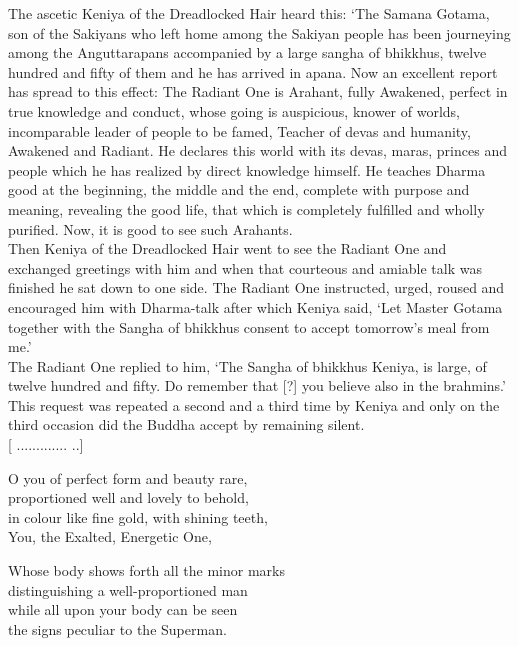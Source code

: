 The ascetic Keniya of the Dreadlocked Hair heard this: `The Samana Gotama, son of the Sakiyans who left home among the Sakiyan people has been journeying among the Anguttarapans accompanied by a large sangha of bhikkhus, twelve hundred and fifty of them and he has arrived in apana. Now an excellent report has spread to this effect: The Radiant One is Arahant, fully Awakened, perfect in true knowledge and conduct, whose going is auspicious, knower of worlds, incomparable leader of people to be famed, Teacher of devas and humanity, Awakened and Radiant. He declares this world with its devas, maras, princes and people which he has realized by direct knowledge himself. He teaches Dharma good at the beginning, the middle and the end, complete with purpose and meaning, revealing the good life, that which is completely fulfilled and wholly purified. Now, it is good to see such Arahants.\\

 Then Keniya of the Dreadlocked Hair went to see the Radiant One and exchanged greetings with him and when that courteous and amiable talk was finished he sat down to one side. The Radiant One instructed, urged, roused and encouraged him with Dharma-talk after which Keniya said, `Let Master Gotama together with the Sangha of bhikkhus consent to accept tomorrow's meal from me.'\\
 
 The Radiant One replied to him, `The Sangha of bhikkhus Keniya, is large, of twelve hundred and ﬁfty. Do remember that [?] you believe also in the brahmins.'\\
 
 This request was repeated a second and a third time by Keniya and only on the third occasion did the Buddha accept by remaining silent.\\
 
   [ ............. ..]\\
   
\begin{MyDescription}{}
O you of perfect form and beauty rare,\\
proportioned well and lovely to behold,\\
in colour like fine gold, with shining teeth,\\
You, the Exalted, Energetic One,
\end{MyDescription} 
\begin{MyDescription}{}
Whose body shows forth all the minor marks\\
distinguishing a well-proportioned man\\
while all upon your body can be seen\\
the signs peculiar to the Superman.
\end{MyDescription} 

